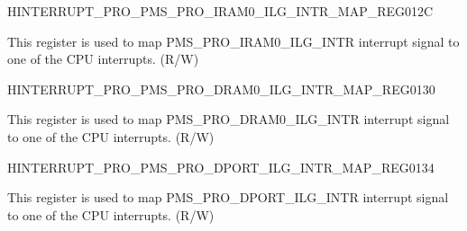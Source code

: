 \begin{register}{H}{INTERRUPT\_PRO\_PMS\_PRO\_IRAM0\_ILG\_INTR\_MAP\_REG}{\hexprefix{}012C}\label{regdesc:INTERRUPTPROPMSPROIRAM0ILGINTRMAPREG}
%
%
\regnewline%
\begin{regdesc}\begin{reglist}
\label{fielddesc:INTERRUPTPROPMSPROIRAM0ILGINTRMAP}\item [INTERRUPT\_PRO\_PMS\_PRO\_IRAM0\_ILG\_INTR\_MAP] This register is used to map PMS\_PRO\_IRAM0\_ILG\_INTR interrupt signal to one of the CPU interrupts. (R/W)
\end{reglist}\end{regdesc}
\end{register}


\begin{register}{H}{INTERRUPT\_PRO\_PMS\_PRO\_DRAM0\_ILG\_INTR\_MAP\_REG}{\hexprefix{}0130}\label{regdesc:INTERRUPTPROPMSPRODRAM0ILGINTRMAPREG}
%
%
\regnewline%
\begin{regdesc}\begin{reglist}
\label{fielddesc:INTERRUPTPROPMSPRODRAM0ILGINTRMAP}\item [INTERRUPT\_PRO\_PMS\_PRO\_DRAM0\_ILG\_INTR\_MAP] This register is used to map PMS\_PRO\_DRAM0\_ILG\_INTR interrupt signal to one of the CPU interrupts. (R/W)
\end{reglist}\end{regdesc}
\end{register}


\begin{register}{H}{INTERRUPT\_PRO\_PMS\_PRO\_DPORT\_ILG\_INTR\_MAP\_REG}{\hexprefix{}0134}\label{regdesc:INTERRUPTPROPMSPRODPORTILGINTRMAPREG}
%
%
\regnewline%
\begin{regdesc}\begin{reglist}
\label{fielddesc:INTERRUPTPROPMSPRODPORTILGINTRMAP}\item [INTERRUPT\_PRO\_PMS\_PRO\_DPORT\_ILG\_INTR\_MAP] This register is used to map PMS\_PRO\_DPORT\_ILG\_INTR interrupt signal to one of the CPU interrupts. (R/W)
\end{reglist}\end{regdesc}
\end{register}


